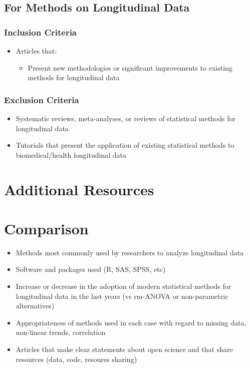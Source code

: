 \documentclass[
]{article}
\providecommand{\tightlist}{%
  \setlength{\itemsep}{0pt}\setlength{\parskip}{0pt}}\usepackage{longtable,booktabs,array}
\begin{document}
\hypertarget{for-methods-on-longitudinal-data-1}{%
\subsection{For Methods on Longitudinal
Data}\label{for-methods-on-longitudinal-data-1}}

\hypertarget{inclusion-criteria-1}{%
\subsubsection{Inclusion Criteria}\label{inclusion-criteria-1}}

\begin{itemize}
\item
  Articles that:

  \begin{itemize}
  \tightlist
  \item
    Present new methodologies or significant improvements to existing
    methods for longitudinal data
  \end{itemize}
\end{itemize}

\hypertarget{exclusion-criteria-1}{%
\subsubsection{Exclusion Criteria}\label{exclusion-criteria-1}}

\begin{itemize}
\item
  Systematic reviews, meta-analyses, or reviews of statistical methods
  for longitudinal data
\item
  Tutorials that present the application of existing statistical methods
  to biomedical/health longitudinal data
\end{itemize}

\hypertarget{additional-resources}{%
\section{Additional Resources}\label{additional-resources}}

\hypertarget{comparison}{%
\section{Comparison}\label{comparison}}

\begin{itemize}
\item
  Methods most commonly used by researchers to analyze longitudinal data
\item
  Software and packages used (R, SAS, SPSS, etc)
\item
  Increase or decrease in the adoption of modern statistical methods for
  longitudinal data in the last  years (vs rm-ANOVA or
  non-parametric alternatives)
\item
  Appropriateness of methods used in each case with regard to missing
  data, non-linear trends, correlation
\item
  Articles that make clear statements about open science and that share
  resources (data, code, resoures sharing)
\end{itemize}
\end{document}
